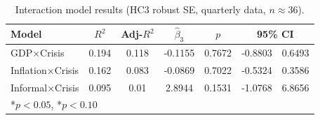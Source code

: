 \begin{table}[h]
\caption{Interaction model results (HC3 robust SE, quarterly data, $n\approx36$).}
\label{tab:interaction_extended}
\footnotesize
\begin{tabular}{lcccccc}
\toprule
\textbf{Model} & $R^2$ & Adj-$R^2$ & $\hat\beta_3$ & $p$ & \multicolumn{2}{c}{95\% CI} \\
\midrule
GDP×Crisis & 0.194 & 0.118 & -0.1155 & 0.7672 & -0.8803 & 0.6493 \\
Inflation×Crisis & 0.162 & 0.083 & -0.0869 & 0.7022 & -0.5324 & 0.3586 \\
Informal×Crisis & 0.095 & 0.01 & 2.8944 & 0.1531 & -1.0768 & 6.8656 \\
\bottomrule
\multicolumn{7}{l}{\scriptsize **$p<0.05$, *$p<0.10$} \\
\end{tabular}
\end{table}